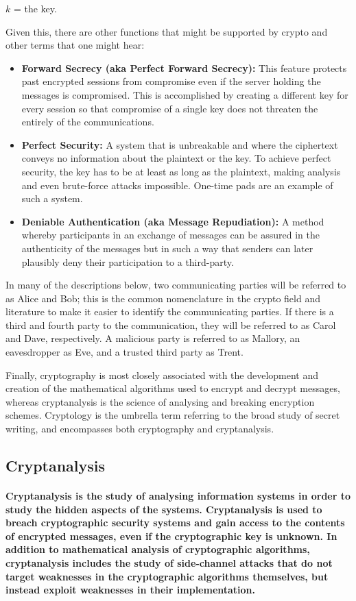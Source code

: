 \documentclass[10pt,british]{article}
\begin{document}
$k$ = the key.

Given this, there are other functions that might be supported by crypto
and other terms that one might hear:
\begin{itemize}
\item \textbf{Forward Secrecy (aka Perfect Forward Secrecy):} This feature
protects past encrypted sessions from compromise even if the server
holding the messages is compromised. This is accomplished by creating
a different key for every session so that compromise of a single key
does not threaten the entirely of the communications. 
\item \textbf{Perfect Security:} A system that is unbreakable and where
the ciphertext conveys no information about the plaintext or the key.
To achieve perfect security, the key has to be at least as long as
the plaintext, making analysis and even brute-force attacks impossible.
One-time pads are an example of such a system.
\item \textbf{Deniable Authentication (aka Message Repudiation): }A method
whereby participants in an exchange of messages can be assured in
the authenticity of the messages but in such a way that senders can
later plausibly deny their participation to a third-party.
\end{itemize}
In many of the descriptions below, two communicating parties will
be referred to as Alice and Bob; this is the common nomenclature in
the crypto field and literature to make it easier to identify the
communicating parties. If there is a third and fourth party to the
communication, they will be referred to as Carol and Dave, respectively.
A malicious party is referred to as Mallory, an eavesdropper as Eve,
and a trusted third party as Trent.

Finally, cryptography is most closely associated with the development
and creation of the mathematical algorithms used to encrypt and decrypt
messages, whereas cryptanalysis is the science of analysing and breaking
encryption schemes. Cryptology is the umbrella term referring to the
broad study of secret writing, and encompasses both cryptography and
cryptanalysis.

\subsection{Cryptanalysis}

\paragraph{\textmd{Cryptanalysis is the study of analysing information systems
in order to study the hidden aspects of the systems. Cryptanalysis
is used to breach cryptographic security systems and gain access to
the contents of encrypted messages, even if the cryptographic key
is unknown. In addition to mathematical analysis of cryptographic
algorithms, cryptanalysis includes the study of side-channel attacks
that do not target weaknesses in the cryptographic algorithms themselves,
but instead exploit weaknesses in their implementation.}}
\end{document}
